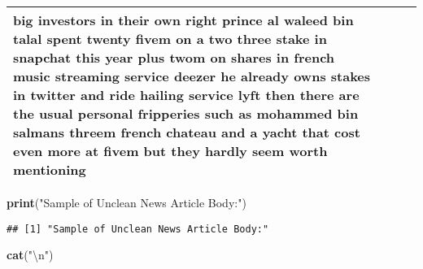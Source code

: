 \documentclass[]{article}
\newenvironment{Shaded}{\begin{snugshade}}{\end{snugshade}}
\newcommand{\KeywordTok}[1]{\textcolor[rgb]{0.13,0.29,0.53}{\textbf{#1}}}
\newcommand{\DecValTok}[1]{\textcolor[rgb]{0.00,0.00,0.81}{#1}}
\newcommand{\CharTok}[1]{\textcolor[rgb]{0.31,0.60,0.02}{#1}}
\newcommand{\StringTok}[1]{\textcolor[rgb]{0.31,0.60,0.02}{#1}}
\newcommand{\OperatorTok}[1]{\textcolor[rgb]{0.81,0.36,0.00}{\textbf{#1}}}
\newcommand{\NormalTok}[1]{#1}
\begin{document}
\begin{table}[!h]
{\begin{tabular}[t]{llll}
big investors in their own right prince al waleed bin talal spent twenty fivem on a two three stake in snapchat this year plus twom on shares in french music streaming service deezer he already owns stakes in twitter and ride hailing service lyft then there are the usual personal fripperies such as mohammed bin salmans threem french chateau and a yacht that cost even more at fivem but they hardly seem worth mentioning\\
\bottomrule
\end{tabular}}
\end{table}


\begin{Shaded}
\begin{Highlighting}[]
\KeywordTok{print}\NormalTok{(}\StringTok{"Sample of Unclean News Article Body:"}\NormalTok{)}
\end{Highlighting}
\end{Shaded}

\begin{verbatim}
## [1] "Sample of Unclean News Article Body:"
\end{verbatim}

\begin{Shaded}
\begin{Highlighting}[]
\KeywordTok{cat}\NormalTok{(}\StringTok{"}\CharTok{\textbackslash{}n}\StringTok{"}\NormalTok{)}
\end{Highlighting}
\end{Shaded}

\begin{Shaded}
\end{Shaded}
\end{document}
